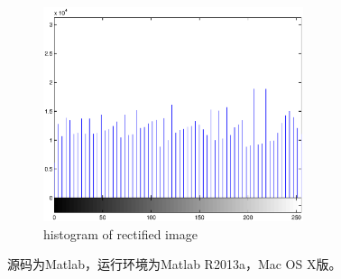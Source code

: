 \documentclass[UTF8]{ctexart}
\begin{document}
\begin{figure}[htbp]
\centerline{\includegraphics[width=3in]{rect.eps}}
\caption[]{histogram of rectified image}
\end{figure}\par
源码为Matlab，运行环境为Matlab R2013a，Mac OS X版。
\end{document}
